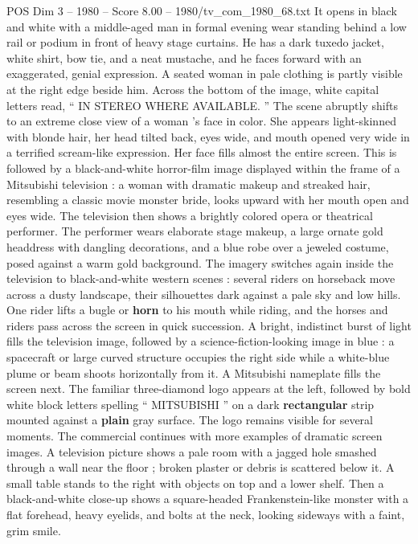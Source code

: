 \begin{textsample}{POS Dim 3 – 1980 – Score 8.00 – 1980/tv\_com\_1980\_68.txt}  \label{ex:f3_pos_045}
It opens in black and white with a middle-aged man in formal evening wear standing behind a low rail or podium in front of heavy stage curtains.
He has a dark tuxedo jacket, white shirt, bow tie, and a neat mustache, and he faces forward with an exaggerated, genial expression.
A seated woman in pale clothing is partly visible at the right edge beside him.
Across the bottom of the image, white capital letters read, “ IN STEREO WHERE AVAILABLE. ” The scene abruptly shifts to an extreme close view of a woman ’s face in color.
She appears light-skinned with blonde hair, her head tilted back, eyes wide, and mouth opened very wide in a terrified scream-like expression.
Her face fills almost the entire screen.
This is followed by a black-and-white horror-film image displayed within the frame of a Mitsubishi television : a woman with dramatic makeup and streaked hair, resembling a classic movie monster bride, looks upward with her mouth open and eyes wide.
The television then shows a brightly colored opera or theatrical performer.
The performer wears elaborate stage makeup, a large ornate gold headdress with dangling decorations, and a blue robe over a jeweled costume, posed against a warm gold background.
The imagery switches again inside the television to black-and-white western scenes : several riders on horseback move across a dusty landscape, their silhouettes dark against a pale sky and low hills.
One rider lifts a bugle or \textbf{horn} to his mouth while riding, and the horses and riders pass across the screen in quick succession.
A bright, indistinct burst of light fills the television image, followed by a science-fiction-looking image in blue : a spacecraft or large curved structure occupies the right side while a white-blue plume or beam shoots horizontally from it.
A Mitsubishi nameplate fills the screen next.
The familiar three-diamond logo appears at the left, followed by bold white block letters spelling “ MITSUBISHI ” on a dark \textbf{rectangular} strip mounted against a \textbf{plain} gray surface.
The logo remains visible for several moments.
The commercial continues with more examples of dramatic screen images.
A television picture shows a pale room with a jagged hole smashed through a wall near the floor ; broken plaster or debris is scattered below it.
A small table stands to the right with objects on top and a lower shelf.
Then a black-and-white close-up shows a square-headed Frankenstein-like monster with a flat forehead, heavy eyelids, and bolts at the neck, looking sideways with a faint, grim smile.

\end{textsample}
